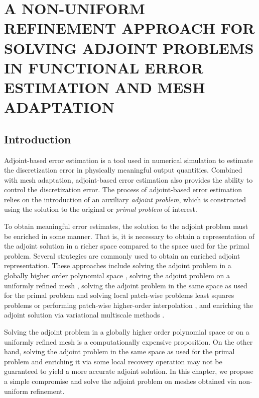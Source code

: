 \chapter{A NON-UNIFORM REFINEMENT APPROACH
FOR SOLVING ADJOINT PROBLEMS IN FUNCTIONAL
ERROR ESTIMATION AND MESH ADAPTATION}
\label{chap:refine}

\section{Introduction}

Adjoint-based error estimation
\cite{becker2001optimal, giles2003adjoint,
pierce2004adjoint, venditti2000adjoint,
venditti2002adjoint,
venditti2003adjoint,
prudhomme1999goal,
prudhomme2003practical,
fidkowski2011review,
connors2013method}
is a tool used in numerical simulation
to estimate the discretization error
in physically meaningful output quantities.
Combined with mesh adaptation, adjoint-based error
estimation also provides the ability to control the discretization
error. The process of adjoint-based error estimation
relies on the introduction of an auxiliary
\emph{adjoint problem}, which is constructed using
the solution to the original or \emph{primal problem}
of interest.

To obtain meaningful error estimates,
the solution to the adjoint problem must be
enriched in some manner. That is, it is
necessary to obtain a representation of the
adjoint solution in a richer space compared
to the space used for the primal problem.
Several strategies are commonly used
to obtain an enriched adjoint representation.
These approaches include
solving the adjoint problem in a globally higher
order polynomial space
\cite{fidkowski2011output},
solving the adjoint problem on a uniformly
refined mesh \cite{burstedde2009parallel},
solving the adjoint problem in the same space
as used for the primal problem
and solving local patch-wise problems least
squares problems \cite{nemec2007adjoint} or
performing patch-wise higher-order interpolation
\cite{becker2001optimal},
and enriching the adjoint solution via
variational multiscale methods
\cite{granzow2017output}.

Solving the adjoint problem in a globally higher
order polynomial space or on a uniformly refined mesh
is a computationally expensive proposition. On the
other hand, solving the adjoint problem in the same
space as used for the primal problem and enriching
it via some local recovery operation may not be guaranteed
to yield a more accurate adjoint solution. In this
chapter, we propose a simple compromise and solve the
adjoint problem on meshes obtained via non-uniform
refinement.

